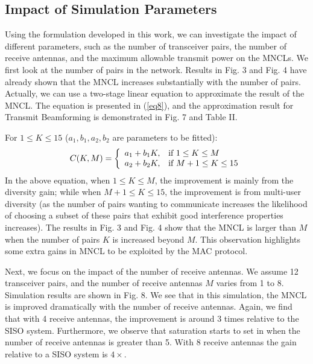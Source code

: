 \documentclass[draftcls,onecolumn,peerview,12pt]{IEEEtran}
\begin{document}
\subsection{Impact of Simulation Parameters}
Using the formulation developed in this work, we can investigate the
impact of different parameters, such as the number of transceiver
pairs, the number of receive antennas, and the maximum allowable
transmit power on the MNCLs. We first look at the number of pairs in
the network. Results in Fig. 3 and Fig. 4 have already shown that
the MNCL increases substantially with the number of pairs. Actually,
we can use a two-stage linear equation to approximate the result of
the MNCL. The equation is presented in (\ref{eq8}), and the
approximation result for Transmit Beamforming is demonstrated in
Fig. 7 and Table II.

For $\mbox{1}\le K\le 15$ ($a_1 ,b_1 ,a_2 ,b_2 $ are parameters to
be fitted):
\begin{equation}
\label{eq8} C(K,M)=\left\{ {{\begin{array}{*{20}c}
 {a_1 +b_1 K,} \hfill & {\mbox{if }1\le K\le M} \hfill \\
 {a_2 +b_2 K,} \hfill & {\mbox{if }M+1\le K\le 15} \hfill \\
\end{array} }} \right.
\end{equation}
In the above equation, when $1\le K\le M$, the improvement is mainly
from the diversity gain; while when $M+1\le K\le 15$, the
improvement is from multi-user diversity (as the number of pairs
wanting to communicate increases the likelihood of choosing a subset
of these pairs that exhibit good interference properties increases).
The results in Fig. 3 and Fig. 4 show that the MNCL is larger than
$M$ when the number of pairs $K$ is increased beyond $M$. This
observation highlights some extra gains in MNCL to be exploited by
the MAC protocol.


Next, we focus on the impact of the number of receive antennas. We
assume 12 transceiver pairs, and the number of receive antennas $M$
varies from 1 to 8. Simulation results are shown in Fig. 8. We see
that in this simulation, the MNCL is improved dramatically with the
number of receive antennas. Again, we find that with 4 receive
antennas, the improvement is around 3 times relative to the SISO
system. Furthermore, we observe that saturation starts to set in
when the number of receive antennas is greater than 5. With 8
receive antennas the gain relative to a SISO system is $4\times$.
\end{document}
